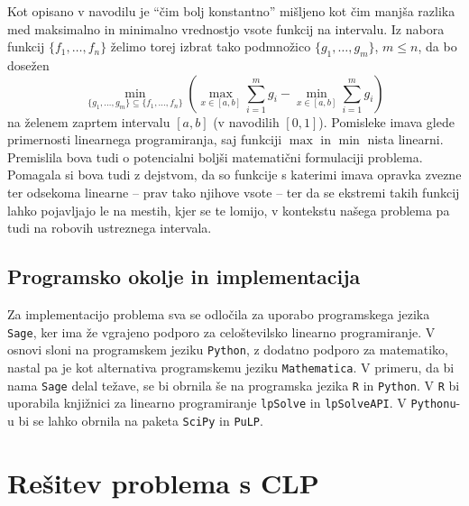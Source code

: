 \documentclass[11pt]{article}
\theoremstyle{definition}
\newcommand{\1}{\mathbbm{1}}
\newcommand{\set}[1]{\{#1\}}
\begin{document}
\noindent Kot opisano v navodilu je ``čim bolj konstantno'' mišljeno kot čim manjša razlika med maksimalno in minimalno vrednostjo vsote funkcij na intervalu. Iz nabora funkcij $\set{f_1,\ldots,f_n}$ želimo torej izbrat tako podmnožico $\set{g_1,\ldots,g_m}$, $m \leq n$, da bo dosežen
$$\min_{\set{g_1,\ldots,g_m} \subseteq \set{f_1,\ldots,f_n}}\left({\max_{x \in [a,b]}\sum_{i=1}^m g_i - \min_{x \in [a,b]}\sum_{i=1}^m g_i}\right)$$
na želenem zaprtem intervalu $[a,b]$ (v navodilih $[0,1]$). Pomisleke imava glede primernosti linearnega programiranja, saj funkciji $\max$ in $\min$ nista linearni. Premislila bova tudi o potencialni boljši matematični formulaciji problema. Pomagala si bova tudi z dejstvom, da so funkcije s katerimi imava opravka zvezne ter odsekoma linearne -- prav tako njihove vsote -- ter da se ekstremi takih funkcij lahko pojavljajo le na mestih, kjer se te lomijo, v kontekstu našega problema pa tudi na robovih ustreznega intervala.

\subsection{Programsko okolje in implementacija}
\vspace{0.5cm}

Za implementacijo problema sva se odločila za uporabo programskega jezika \texttt{Sage}, ker ima že vgrajeno podporo za celoštevilsko linearno programiranje. V osnovi sloni na programskem jeziku \texttt{Python}, z dodatno podporo za matematiko, nastal pa je kot alternativa programskemu jeziku \texttt{Mathematica}. V primeru, da bi nama \texttt{Sage} delal težave, se bi obrnila še na programska jezika \texttt{R} in \texttt{Python}. V \texttt{R} bi uporabila knjižnici za linearno programiranje \texttt{lpSolve} in \texttt{lpSolveAPI}. V \texttt{Pythonu}-u bi se lahko obrnila na paketa \texttt{SciPy} in \texttt{PuLP}.


\section{Rešitev problema s CLP}
\vspace{0.5cm}
\end{document}
